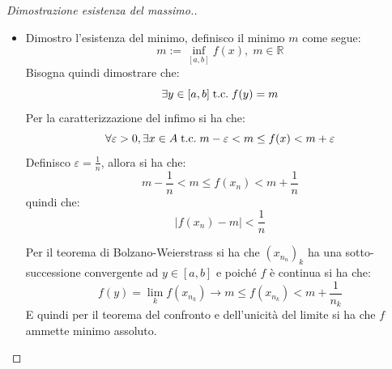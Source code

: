 \documentclass[a4paper,12pt,openright]{book}
\begin{document}
\begin{proof}[Dimostrazione esistenza del massimo.]
\begin{itemize}
        	\item Dimostro l'esistenza del minimo, definisco il minimo $m$ come segue:
        	\[m := \inf_{[a, b]} f(x), \; m \in \mathbb{R}\]
        	Bisogna quindi dimostrare che:
        	\[\exists y \in [a, b] \;\text{t.c.}\; f(y) = m\]
        	Per la caratterizzazione del infimo si ha che:
        	\[\forall \varepsilon > 0, \exists x \in A \;\text{t.c.}\; m - \varepsilon < m \leq f(x) < m + \varepsilon\]
        	Definisco $\varepsilon = \frac{1}{n}$, allora si ha che:
        	\[m - \frac{1}{n} < m \leq f(x_n) < m + \frac{1}{n}\]
        	quindi che:
        	\[|f(x_n) - m| < \frac{1}{n}\]
        	
        	Per il teorema di Bolzano-Weierstrass si ha che $(x_{n_n})_k$ ha una sotto-successione convergente ad $y \in [a, b]$ e poiché $f$ è continua si ha che:
        	\[f(y) = \lim_{k} f(x_{n_k}) \rightarrow m \leq f(x_{n_k}) < m + \frac{1}{n_k}\]
        	E quindi per il teorema del confronto e dell'unicità del limite si ha che $f$ ammette minimo assoluto.
        \end{itemize}        
    \end{proof}
    
\end{document}
